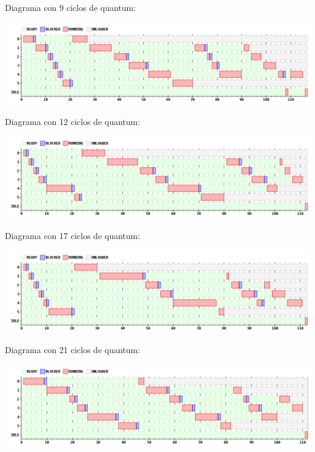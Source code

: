 \par Diagrama con 9 ciclos de quantum:
\begin {center}
\includegraphics[width=16cm]{../simusched/outputs/ej7/rr-ej7-1-9.png}
\end {center}

\par Diagrama con 12 ciclos de quantum:
\begin {center}
\includegraphics[width=16cm]{../simusched/outputs/ej7/rr-ej7-1-12.png}
\end {center}

\par Diagrama con 17 ciclos de quantum:
\begin {center}
\includegraphics[width=16cm]{../simusched/outputs/ej7/rr-ej7-1-17.png}
\end {center}

\par Diagrama con 21 ciclos de quantum:
\begin {center}
\includegraphics[width=16cm]{../simusched/outputs/ej7/rr-ej7-1-21.png}
\end {center}

